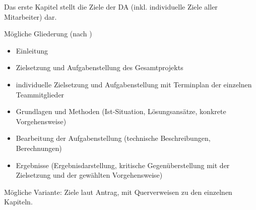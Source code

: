 \documentclass[
    headings=optiontotocandhead,%
    twoside,
    numbers=noenddot,%
    toc=flat, %
    12pt, %
    titlepage, %
    parskip=full, %
    listof=totoc, %
    listof=flat, %
    numbers=noenddot, %
    bibliography=totoc, %
    a4paper,DIV=14,
    BCOR=15mm,
]{scrbook}
\begin{document}
Das erste Kapitel stellt die Ziele der DA (inkl. individuelle Ziele
aller Mitarbeiter) dar.

Mögliche Gliederung (nach \cite{leitfaden})

\begin{itemize}
\item  Einleitung
\item   Zielsetzung und Aufgabenstellung des Gesamtprojekts
\item   individuelle Zielsetzung und Aufgabenstellung mit Terminplan der einzelnen Teammitglieder
\item   Grundlagen und Methoden (Ist-Situation, Lösungsansätze, konkrete Vorgehensweise)
\item   Bearbeitung der Aufgabenstellung (technische Beschreibungen, Berechnungen)
\item   Ergebnisse (Ergebnisdarstellung, kritische Gegenüberstellung mit der Zielsetzung
 und der gewählten Vorgehensweise)
\end{itemize}

Mögliche Variante: Ziele laut Antrag, mit Querverweisen zu den einzelnen Kapiteln.










\appendix



%



\raggedright %


\end{document}
